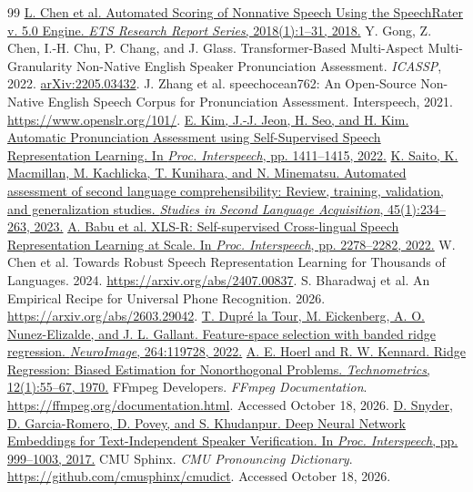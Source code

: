 \documentclass[cameraready]{Interspeech}
\begin{document}
\begin{thebibliography}{99}
 \href{https://doi.org/10.1002/ets2.12198}{L. Chen et al. Automated Scoring of Nonnative Speech Using the SpeechRater v. 5.0 Engine. \textit{ETS Research Report Series}, 2018(1):1--31, 2018.}
 Y. Gong, Z. Chen, I.-H. Chu, P. Chang, and J. Glass. Transformer-Based Multi-Aspect Multi-Granularity Non-Native English Speaker Pronunciation Assessment. \textit{ICASSP}, 2022. \href{https://arxiv.org/abs/2205.03432}{arXiv:2205.03432}.
 J. Zhang et al. speechocean762: An Open-Source Non-Native English Speech Corpus for Pronunciation Assessment. Interspeech, 2021. \url{https://www.openslr.org/101/}.
 \href{https://doi.org/10.21437/Interspeech.2022-10245}{E. Kim, J.-J. Jeon, H. Seo, and H. Kim. Automatic Pronunciation Assessment using Self-Supervised Speech Representation Learning. In \textit{Proc. Interspeech}, pp. 1411--1415, 2022.}
 \href{https://doi.org/10.1017/S0272263122000080}{K. Saito, K. Macmillan, M. Kachlicka, T. Kunihara, and N. Minematsu. Automated assessment of second language comprehensibility: Review, training, validation, and generalization studies. \textit{Studies in Second Language Acquisition}, 45(1):234--263, 2023.}
 \href{https://doi.org/10.21437/Interspeech.2022-143}{A. Babu et al. XLS-R: Self-supervised Cross-lingual Speech Representation Learning at Scale. In \textit{Proc. Interspeech}, pp. 2278--2282, 2022.}
 W. Chen et al. Towards Robust Speech Representation Learning for Thousands of Languages. 2024. \url{https://arxiv.org/abs/2407.00837}.
 S. Bharadwaj et al. An Empirical Recipe for Universal Phone Recognition. 2026. \url{https://arxiv.org/abs/2603.29042}.
 \href{https://doi.org/10.1016/j.neuroimage.2022.119728}{T. Dupr\'e la Tour, M. Eickenberg, A. O. Nunez-Elizalde, and J. L. Gallant. Feature-space selection with banded ridge regression. \textit{NeuroImage}, 264:119728, 2022.}
 \href{https://doi.org/10.1080/00401706.1970.10488634}{A. E. Hoerl and R. W. Kennard. Ridge Regression: Biased Estimation for Nonorthogonal Problems. \textit{Technometrics}, 12(1):55--67, 1970.}
 FFmpeg Developers. \textit{FFmpeg Documentation}. \url{https://ffmpeg.org/documentation.html}. Accessed October 18, 2026.
 \href{https://doi.org/10.21437/Interspeech.2017-620}{D. Snyder, D. Garcia-Romero, D. Povey, and S. Khudanpur. Deep Neural Network Embeddings for Text-Independent Speaker Verification. In \textit{Proc. Interspeech}, pp. 999--1003, 2017.}
 CMU Sphinx. \textit{CMU Pronouncing Dictionary}. \url{https://github.com/cmusphinx/cmudict}. Accessed October 18, 2026.

\end{thebibliography}
\end{document}
